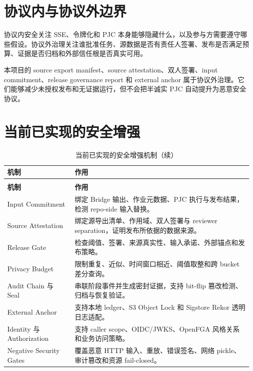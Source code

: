 \documentclass[UTF8,a4paper,12pt,oneside]{ctexrep}
\begin{document}
\section{协议内与协议外边界}

协议内安全关注 SSE、令牌化和 PJC 本身能够隐藏什么，以及参与方需要遵守哪些假设。协议外治理关注谁批准任务、源数据是否有责任人签署、发布是否满足预算、证据是否归档和外部信任根是否真实可用。

本项目的 source export manifest、source attestation、双人签署、input commitment、release governance report 和 external anchor 属于协议外治理。它们能够减少未授权发布和无证据运行，但不会把半诚实 PJC 自动提升为恶意安全协议。

\section{当前已实现的安全增强}

\begingroup
\renewcommand{\arraystretch}{1.3}
\begin{longtable}{%
  >{\raggedright\arraybackslash}p{}%
  @{\hspace{0.02\textwidth}}%
  >{\raggedright\arraybackslash}p{}%
}
\caption{当前已实现的安全增强机制}\label{tab:security-controls}\\
\toprule
\textbf{机制} & \textbf{作用} \\
\midrule
\endfirsthead
\caption[]{当前已实现的安全增强机制（续）}\\
\toprule
\textbf{机制} & \textbf{作用} \\
\midrule
\endhead
\bottomrule
\endfoot
\bottomrule
\endlastfoot
Input Commitment & 绑定 Bridge 输出、作业元数据、PJC 执行与发布结果，检测 repo-side 输入替换。 \\
Source Attestation & 绑定源导出清单、作用域、双人签署与 reviewer separation，证明发布所依据的数据来源。 \\
Release Gate & 检查阈值、签署、来源真实性、输入承诺、外部锚点和发布策略。 \\
Privacy Budget & 限制重复、近似、时间窗口相近、阈值取整和跨 bucket 差分查询。 \\
Audit Chain 与 Seal & 串联阶段事件并生成密封证据，支持 bit-flip 篡改检测、归档与恢复验证。 \\
External Anchor & 支持本地 ledger、S3 Object Lock 和 Sigstore Rekor 透明日志适配。 \\
Identity 与 Authorization & 支持 caller scope、OIDC/JWKS、OpenFGA 风格关系和业务访问策略。 \\
Negative Security Gates & 覆盖恶意 HTTP 输入、重放、错误签名、网络 pickle、审计篡改和资源 fail-closed。 \\
\end{longtable}
\endgroup
\end{document}
